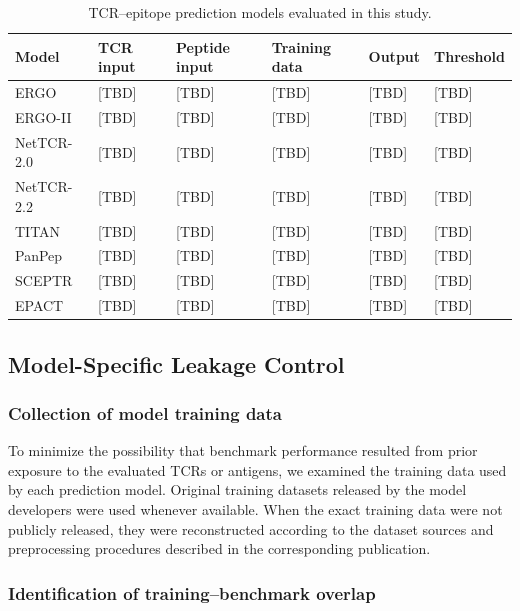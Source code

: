 \begin{table}[t]
\centering
\caption{TCR--epitope prediction models evaluated in this study.}
\label{tab:models}
\begin{tabular}{llllll}
\hline
Model & TCR input & Peptide input & Training data & Output & Threshold \\
\hline
ERGO       & [TBD] & [TBD] & [TBD] & [TBD] & [TBD] \\
ERGO-II    & [TBD] & [TBD] & [TBD] & [TBD] & [TBD] \\
NetTCR-2.0 & [TBD] & [TBD] & [TBD] & [TBD] & [TBD] \\
NetTCR-2.2 & [TBD] & [TBD] & [TBD] & [TBD] & [TBD] \\
TITAN      & [TBD] & [TBD] & [TBD] & [TBD] & [TBD] \\
PanPep     & [TBD] & [TBD] & [TBD] & [TBD] & [TBD] \\
SCEPTR     & [TBD] & [TBD] & [TBD] & [TBD] & [TBD] \\
EPACT      & [TBD] & [TBD] & [TBD] & [TBD] & [TBD] \\
\hline
\end{tabular}
\end{table}


\subsection{Model-Specific Leakage Control}

\subsubsection{Collection of model training data}

To minimize the possibility that benchmark performance resulted from prior exposure to the evaluated TCRs or antigens, we examined the training data 
used by each prediction model. Original training datasets released by the model developers were used whenever available. When the exact training data 
were not publicly released, they were reconstructed according to the dataset 
sources and preprocessing procedures described in the corresponding 
publication.



\subsubsection{Identification of training--benchmark overlap}

